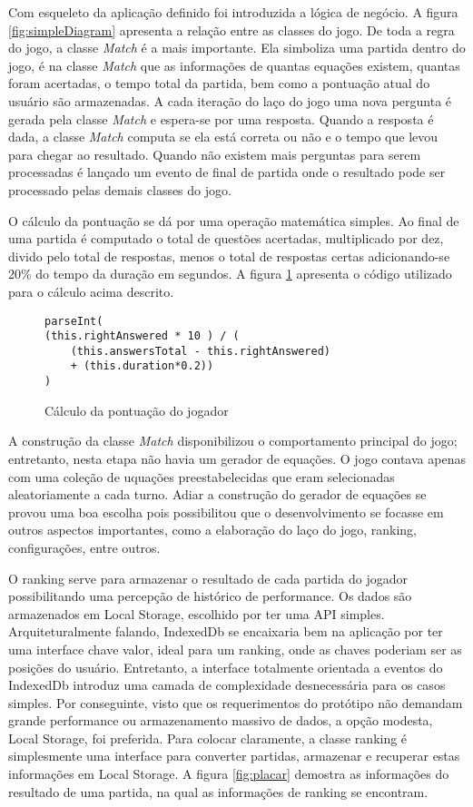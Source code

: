 Com esqueleto da aplicação definido foi introduzida a lógica
de negócio. A figura \ref{fig:simpleDiagram} apresenta a
relação entre as classes do jogo. De toda a regra do jogo, a classe
\textit{Match} é a mais importante. Ela simboliza uma partida dentro
do jogo, é na classe \textit{Match} que as informações de quantas
equações existem, quantas foram acertadas, o tempo total da partida,
bem como a pontuação atual do usuário são armazenadas. A cada
iteração do laço do jogo uma nova pergunta é gerada pela classe
\textit{Match} e espera-se por uma resposta. Quando a resposta é dada,
a classe \textit{Match} computa se ela está correta ou não e
o tempo que levou para chegar ao resultado. Quando não existem mais
perguntas para serem processadas é lançado um evento de final de
partida onde o resultado pode ser processado pelas demais classes do
jogo.

O cálculo da pontuação se dá por uma operação matemática simples.
Ao final de uma partida é computado o total de questões acertadas,
multiplicado por dez, divido pelo total de respostas, menos o total de
respostas certas adicionando-se 20\% do tempo da duração em segundos.
A figura \ref{fig:punctuationCalculation} apresenta o código utilizado
para o cálculo acima descrito.

\begin{figure}[H]
\centering
\begin{verbatim}
parseInt(
(this.rightAnswered * 10 ) / (
    (this.answersTotal - this.rightAnswered) 
    + (this.duration*0.2))
)
\end{verbatim}
\caption{Cálculo da pontuação do jogador}
\label{fig:punctuationCalculation}
\end{figure}

A construção da classe \textit{Match} disponibilizou o comportamento
principal do jogo; entretanto, nesta etapa não havia um gerador de
equações. O jogo contava apenas com uma coleção de uquações
preestabelecidas que eram selecionadas aleatoriamente a cada turno.
Adiar a construção do gerador de equações se provou uma boa
escolha pois possibilitou que o desenvolvimento se focasse em outros
aspectos importantes, como a elaboração do laço do jogo, ranking,
configurações, entre outros.

O ranking serve para armazenar o resultado de cada partida do jogador
possibilitando uma percepção de histórico de performance. Os
dados são armazenados em Local Storage, escolhido por ter uma API
simples. Arquiteturalmente falando, IndexedDb se encaixaria bem na
aplicação por ter uma interface chave valor, ideal para um ranking,
onde as chaves poderiam ser as posições do usuário. Entretanto, a
interface totalmente orientada a eventos do IndexedDb introduz uma
camada de complexidade desnecessária para os casos simples. Por
conseguinte, visto que os requerimentos do protótipo não demandam
grande performance ou armazenamento massivo de dados, a opção
modesta, Local Storage, foi preferida. Para colocar claramente, a
classe ranking é simplesmente uma interface para converter partidas,
armazenar e recuperar estas informações em Local Storage. A figura
\ref{fig:placar} demostra as informações do resultado de uma partida,
na qual as informações de ranking se encontram.

